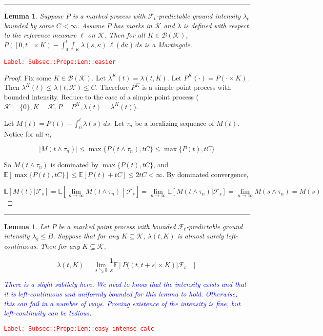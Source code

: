 \documentclass[12pt]{article}
\newcommand{\mb}{\mathbb}
\newcommand{\mc}{\mathcal}
\newcommand{\ms}{\mathscr}
\newcommand{\ra}{\rightarrow}
\newcommand{\tr}{\textcolor{red}}
\newcommand{\tb}{\textcolor{blue}}
\newcommand{\labe}[1]{\tr{\texttt{Label: #1}}}
\newcommand{\lin}{\rule{\linewidth}{0.4 pt}}
\newcommand{\ex}[1]{\mb{E}\left[#1\right]}			%
\renewcommand{\S}{S}							%
\renewcommand{\t}{t}							%
\renewcommand{\tt}{s}							%
\newcommand{\F}{\mc{F}}							%
\newcommand{\ts}[1]{_{#1}}						%
\newcommand{\const}{C}							%
\newcommand{\Sm}{\ell}							%
\newcommand{\rate}{\lambda}						%
\newcommand{\indx}[1]{_{#1}}					%
\newcommand{\rt}{\tau}							%
\renewcommand{\mark}{\kappa}					%
\newcommand{\rp}{P}								%
\newcommand{\gid}[1]{^{#1}}						%
\newcommand{\mspce}{\mc{K}}						%
\newtheorem{lem}[thms]{Lemma}
\begin{document}
\lin

\begin{lem}
Suppose \(\rp\) is a marked process with \(\F\ts{\t}\)-predictable ground intensity \(\rate\ts{\t}\) bounded by some \(\const < \infty\). Assume \(\rp\) has marks in \(\mspce\) and \(\rate\) is defined with respect to the reference measure \(\Sm\) on \(\mspce\). Then for all \(K \in \ms{B}(\mspce)\), \(\rp([0,\t]\times K) - \int_0^\t\int_K \rate(\tt,\mark)\,\ell(d\mark)\,ds\) is a Martingale.
\label{Subsec::Prope:Lem::easier}
\end{lem}
\labe{Subsec::Prope:Lem::easier}

\begin{proof}
Fix some \(K \in \ms{B}(\mspce)\). Let \(\rate\gid{K}(\t) = \rate(\t,K)\). Let \(\rp\gid{K}(\cdot) = \rp(\cdot\times K)\). Then \(\rate\gid{K}(\t) \leq \rate(\t,\mspce) \leq \const\). Therefore \(\rp\gid{K}\) is a simple point process with bounded intensity. Reduce to the case of a simple point process (\(\mspce = \{0\}, K = \mspce, \rp = \rp\gid{K},\rate(\t) = \rate\gid{K}(\t)\)).

Let \(M(\t) = \rp(\t) - \int_0^\t \rate(\tt)\,ds\). Let \(\rt\indx{n}\) be a localizing sequence of \(M(\t)\). Notice for all \(n\),

\[|M(\t\wedge \rt\indx{n})| \leq \max\{\rp(\t\wedge \rt\indx{n}),\t\const\}\leq \max\{\rp(\t),\t\const\}\]

So \(M(\t\wedge\rt\indx{n})\) is dominated by \(\max\{\rp(\t),\t\const\}\), and \(\ex{\max\{\rp(\t),\t\const\}} \leq \ex{\rp(\t) + \t\const} \leq 2\t\const < \infty\). By dominated convergence,

\[\ex{M(\t)|\F\ts{\tt}} = \ex{\lim_{n\ra\infty} M(\t\wedge \rt\indx{n})\middle|\F\ts{\tt}} = \lim_{n\ra\infty}\ex{M(\t\wedge \rt\indx{n})|\F\ts{\tt}} = \lim_{n\ra\infty} M(\tt\wedge \rt\indx{n}) = M(\tt)\]
\end{proof}

\lin

\begin{lem}
Let \(\rp\) be a marked point process with bounded \(\F\ts{\t}\)-predictable ground intensity \(\rate_g\leq B\). Suppose that for any \(K \subseteq \mspce\), \(\rate(\t,K)\) is almost surely left-continuous. Then for any \(K \subseteq \mspce\),

\[\rate(\t,K) = \lim_{s\searrow 0}\frac{1}{\tt}\ex{\rp((\t,\t+\tt]\times K)|\F\ts{\t-}}\]

\tb{There is a slight subtlety here. We need to know that the intensity exists and that it is left-continuous and uniformly bounded for this lemma to hold. Otherwise, this can fail in a number of ways. Proving existence of the intensity is fine, but left-continuity can be tedious.}

\label{Subsec::Prope:Lem::easy intense calc}
\end{lem}
\labe{Subsec::Prope:Lem::easy intense calc}
\end{document}
